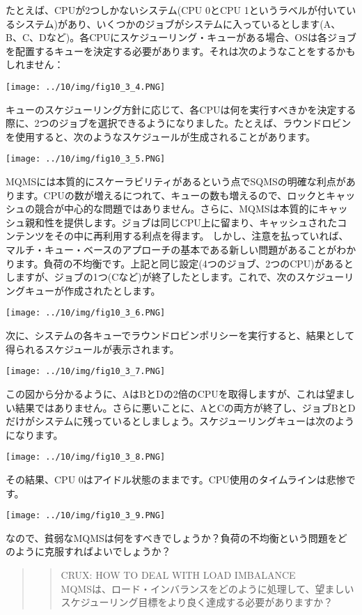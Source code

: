 たとえば、CPUが2つしかないシステム(CPU 0とCPU
1というラベルが付いているシステム)があり、いくつかのジョブがシステムに入っているとします(A、B、C、Dなど)。各CPUにスケジューリング・キューがある場合、OSは各ジョブを配置するキューを決定する必要があります。それは次のようなことをするかもしれません：

\texttt{[image: ../10/img/fig10\_3\_4.PNG]}

キューのスケジューリング方針に応じて、各CPUは何を実行すべきかを決定する際に、2つのジョブを選択できるようになりました。たとえば、ラウンドロビンを使用すると、次のようなスケジュールが生成されることがあります。

\texttt{[image: ../10/img/fig10\_3\_5.PNG]}

MQMSには本質的にスケーラビリティがあるという点でSQMSの明確な利点があります。CPUの数が増えるにつれて、キューの数も増えるので、ロックとキャッシュの競合が中心的な問題ではありません。さらに、MQMSは本質的にキャッシュ親和性を提供します。ジョブは同じCPU上に留まり、キャッシュされたコンテンツをその中に再利用する利点を得ます。
しかし、注意を払っていれば、マルチ・キュー・ベースのアプローチの基本である新しい問題があることがわかります。負荷の不均衡です。上記と同じ設定(4つのジョブ、2つのCPU)があるとしますが、ジョブの1つ(Cなど)が終了したとします。これで、次のスケジューリングキューが作成されたとします。

\texttt{[image: ../10/img/fig10\_3\_6.PNG]}

次に、システムの各キューでラウンドロビンポリシーを実行すると、結果として得られるスケジュールが表示されます。

\texttt{[image: ../10/img/fig10\_3\_7.PNG]}

この図から分かるように、AはBとDの2倍のCPUを取得しますが、これは望ましい結果ではありません。さらに悪いことに、AとCの両方が終了し、ジョブBとDだけがシステムに残っているとしましょう。スケジューリングキューは次のようになります。

\texttt{[image: ../10/img/fig10\_3\_8.PNG]}

その結果、CPU
0はアイドル状態のままです。CPU使用のタイムラインは悲惨です。

\texttt{[image: ../10/img/fig10\_3\_9.PNG]}

なので、貧弱なMQMSは何をすべきでしょうか？負荷の不均衡という問題をどのように克服すればよいでしょうか？

\begin{quote}
\begin{quote}
CRUX: HOW TO DEAL WITH LOAD IMBALANCE\\
MQMSは、ロード・インバランスをどのように処理して、望ましいスケジューリング目標をより良く達成する必要がありますか？
\end{quote}
\end{quote}

